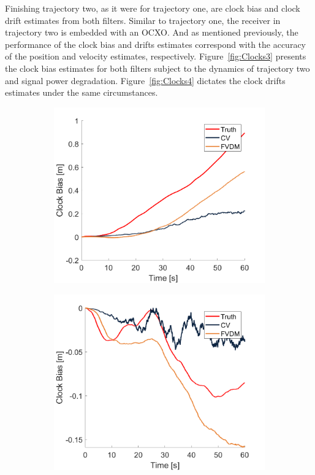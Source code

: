 Finishing trajectory two, as it were for trajectory one, are clock bias and clock drift estimates from both filters. Similar to trajectory one, the receiver in trajectory two is embedded with an OCXO\@. And as mentioned previously, the performance of the clock bias and drifts estimates correspond with the accuracy of the position and velocity estimates, respectively. Figure~\ref{fig:Clocks3} presents the clock bias estimates for both filters subject to the dynamics of trajectory two and signal power degradation. Figure~\ref{fig:Clocks4} dictates the clock drifts estimates under the same circumstances.


\begin{figure}[!ht]
    \begin{subfigure}{.45\textwidth}
        \centering
        \includegraphics[width=1\linewidth]{Figures/dynamic/25/CLOCKBIAS.png}
    \end{subfigure}
    \begin{subfigure}{.45\textwidth}
        \centering
        \includegraphics[width=1\linewidth]{Figures/dynamic/35/CLOCKBIAS.png}

\end{subfigure}
\end{figure}
